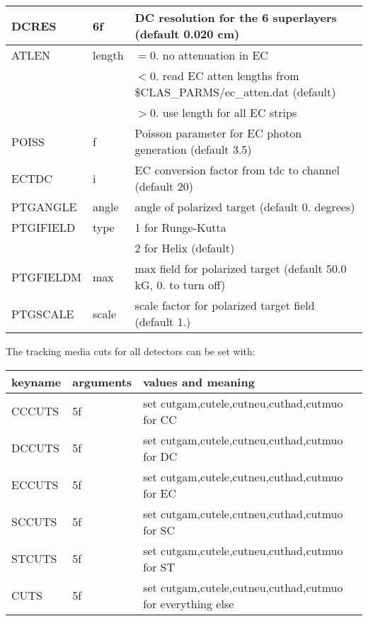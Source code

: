\documentclass{article}
\begin{document}
\begin{center}
\begin{tabular}{|l|l|l|}
DCRES     &  6f          &  DC resolution for the 6 superlayers (default 0.020 cm) \\ \hline
ATLEN     &  length    	 &  $=0.$ no attenuation in EC\\
          &          	 &  $<0.$ read EC atten lengths from \$CLAS\_PARMS/ec\_atten.dat (default)\\
          &       	 &  $>0.$ use length for all EC strips \\ \hline
POISS     &  f           &  Poisson parameter for EC photon generation (default 3.5) \\ \hline
ECTDC     &  i           &  EC conversion factor from tdc to channel (default 20) \\ \hline
PTGANGLE  &  angle       &  angle of polarized target (default 0. degrees) \\ \hline
PTGIFIELD &  type        &  1 for Runge-Kutta \\
          &              &  2 for Helix (default) \\ \hline
PTGFIELDM &  max         &  max field for polarized target (default 50.0 kG, 0. to turn off) \\ \hline
PTGSCALE  &  scale       &  scale factor for polarized target field (default 1.) \\ \hline
\end{tabular}
\end{center}


\par
\noindent
The tracking media cuts for all detectors can be set with:
\par
\begin{center}
\begin{tabular}{|l|l|l|} \hline
keyname   & arguments    &  values and meaning \\ \hline
CCCUTS    &  5f    	 &  set cutgam,cutele,cutneu,cuthad,cutmuo for CC \\ \hline
DCCUTS    &  5f    	 &  set cutgam,cutele,cutneu,cuthad,cutmuo for DC \\ \hline
ECCUTS    &  5f    	 &  set cutgam,cutele,cutneu,cuthad,cutmuo for EC \\ \hline
SCCUTS    &  5f    	 &  set cutgam,cutele,cutneu,cuthad,cutmuo for SC \\ \hline
STCUTS    &  5f    	 &  set cutgam,cutele,cutneu,cuthad,cutmuo for ST \\ \hline
CUTS      &  5f    	 &  set cutgam,cutele,cutneu,cuthad,cutmuo for everything else \\ \hline
\end{tabular}
\end{center}
\end{document}
